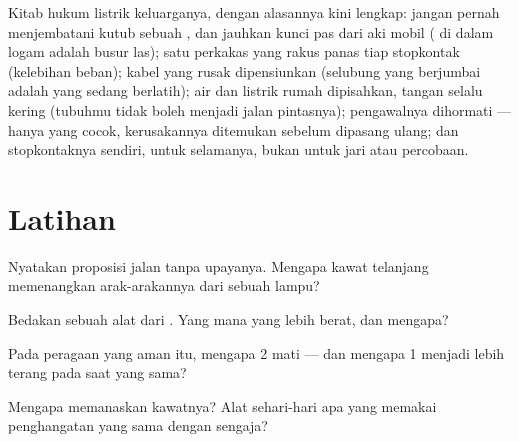 \begin{remark}\label{rem:g7:short-circuits-safety:rules}
Kitab hukum listrik keluarganya, dengan alasannya kini lengkap: jangan
pernah menjembatani kutub sebuah , dan jauhkan kunci pas dari
aki mobil (  di dalam logam adalah busur las); satu
perkakas yang rakus panas tiap stopkontak (kelebihan beban); kabel
yang rusak dipensiunkan (selubung yang berjumbai adalah  yang
sedang berlatih); air dan listrik rumah dipisahkan, tangan selalu
kering (tubuhmu tidak boleh menjadi jalan pintasnya); pengawalnya
dihormati --- hanya  yang cocok, kerusakannya ditemukan sebelum
dipasang ulang; dan stopkontaknya sendiri, untuk selamanya, bukan
untuk jari atau percobaan.
\end{remark}

\section{Latihan}

\begin{exercise}[$\star$]\label{exo:g7:short-circuits-safety:1}
Nyatakan proposisi jalan tanpa upayanya. Mengapa kawat telanjang
memenangkan arak-arakannya dari sebuah lampu?
\end{exercise}

\begin{exercise}[$\star$]\label{exo:g7:short-circuits-safety:2}
Bedakan  sebuah alat dari  . Yang mana
yang lebih berat, dan mengapa?
\end{exercise}

\begin{exercise}[$\star$]\label{exo:g7:short-circuits-safety:3}
Pada peragaan yang aman itu, mengapa  2 mati --- dan mengapa
 1 menjadi lebih terang pada saat yang sama?
\end{exercise}

\begin{exercise}[$\star$]\label{exo:g7:short-circuits-safety:4}
Mengapa  memanaskan kawatnya? Alat sehari-hari apa yang
memakai penghangatan yang sama dengan sengaja?
\end{exercise}

